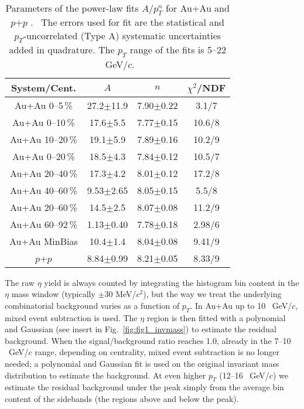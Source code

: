 \documentclass[aps,prc,superscriptaddress,showpacs,nofootinbib,floatfix,twocolumn]{revtex4}
\def\pt{$p_T$}
\def\pts{$p_T$ }
\def\gevc{~GeV/$c$}
\def\gevcs{~GeV/$c$ }
\def\pp{$p$+$p$ }
\def\hs{$\eta$ }
\begin{document}
\begin{table}[hb]
\caption{Parameters of the power-law fits $A/p_T^n$ 
for Au+Au and \pp.  \
The errors used for fit are the statistical and \pt-uncorrelated
(Type A) systematic uncertainties added in quadrature.  The \pts
range of the fits is 5--22 \gevc.}
\label{table:specfitparams}
\begin{ruledtabular}
\begin{tabular}{cccc}
System/Cent. & $A$ & $n$ & $\chi^2$/NDF \\
\hline
Au+Au 0--5\,\% & 27.2$\pm$11.9 & 7.90$\pm$0.22 & 3.1/7 \\
Au+Au 0--10\,\% & 17.6$\pm$5.5 & 7.77$\pm$0.15 & 10.6/8 \\
Au+Au 10--20\,\% & 19.1$\pm$5.9 & 7.89$\pm$0.16 & 10.2/9 \\
Au+Au 0--20\,\% & 18.5$\pm$4.3 & 7.84$\pm$0.12 & 10.5/7 \\
Au+Au 20--40\,\% & 17.3$\pm$4.2 & 8.01$\pm$0.12 & 17.2/8 \\
Au+Au 40--60\,\% & 9.53$\pm$2.65 & 8.05$\pm$0.15 & 5.5/8 \\
Au+Au 20--60\,\% & 14.5$\pm$2.5 & 8.07$\pm$0.08 & 11.2/9 \\
Au+Au 60--92\,\% & 1.13$\pm$0.40 & 7.78$\pm$0.18 & 2.98/6 \\
Au+Au MinBias & 10.4$\pm$1.4 & 8.04$\pm$0.08 & 9.41/9 \\
\pp & 8.84$\pm$0.99 & 8.21$\pm$0.05 & 8.33/9 \\
\end{tabular}
\end{ruledtabular}
\end{table}

The raw \hs yield is always counted by integrating the histogram bin 
content in the \hs mass window (typically $\pm$30 MeV/$c^2$), but the 
way we treat the underlying combinatorial background varies as a 
function of \pt.  In Au+Au up to 10 \gevc, mixed event subtraction is 
used.  The \hs region is then fitted with a polynomial and Gaussian 
(see insert in Fig.~\ref{fig:fig1_invmass}) to estimate the residual 
background.  When the signal/background ratio reaches 1.0, already in 
the 7--10 \gevcs range, depending on centrality, mixed event 
subtraction is no longer needed; a polynomial and Gaussian fit is used 
on the original invariant mass distribution to estimate the 
background.  At even higher \pts (12--16 \gevc) we estimate the 
residual background under the peak simply from the average bin content 
of the sidebands (the regions above and below the peak).
\end{document}

